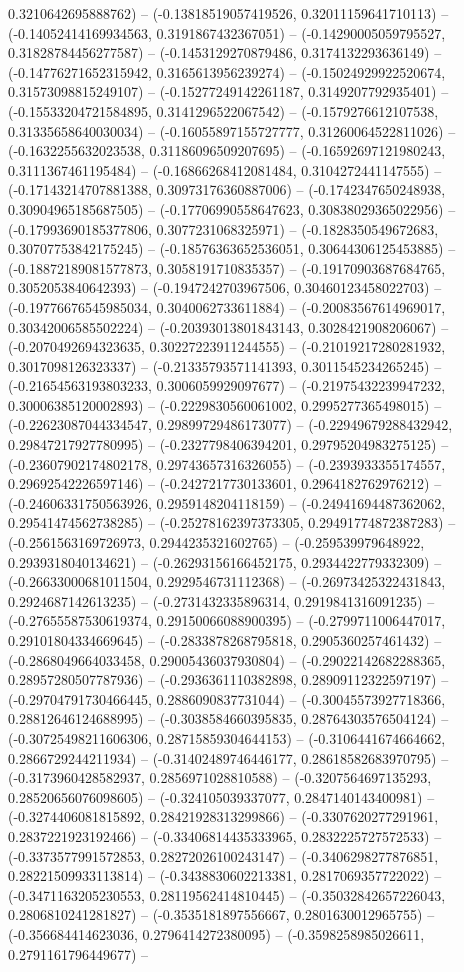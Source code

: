0.3210642695888762) -- (-0.13818519057419526, 0.32011159641710113) -- (-0.14052414169934563, 0.3191867432367051) -- (-0.14290005059795527, 0.31828784456277587) -- (-0.1453129270879486, 0.3174132293636149) -- (-0.14776271652315942, 0.3165613956239274) -- (-0.15024929922520674, 0.31573098815249107) -- (-0.15277249142261187, 0.3149207792935401) -- (-0.15533204721584895, 0.3141296522067542) -- (-0.1579276612107538, 0.31335658640030034) -- (-0.16055897155727777, 0.31260064522811026) -- (-0.1632255632023538, 0.31186096509207695) -- (-0.16592697121980243, 0.3111367461195484) -- (-0.16866268412081484, 0.3104272441147555) -- (-0.17143214707881388, 0.30973176360887006) -- (-0.1742347650248938, 0.30904965185687505) -- (-0.17706990558647623, 0.30838029365022956) -- (-0.17993690185377806, 0.3077231068325971) -- (-0.1828350549672683, 0.30707753842175245) -- (-0.18576363652536051, 0.30644306125453885) -- (-0.18872189081577873, 0.3058191710835357) -- (-0.19170903687684765, 0.3052053840642393) -- (-0.1947242703967506, 0.30460123458022703) -- (-0.19776676545985034, 0.3040062733611884) -- (-0.20083567614969017, 0.30342006585502224) -- (-0.20393013801843143, 0.3028421908206067) -- (-0.2070492694323635, 0.30227223911244555) -- (-0.21019217280281932, 0.3017098126323337) -- (-0.21335793571141393, 0.3011545234265245) -- (-0.21654563193803233, 0.3006059929097677) -- (-0.21975432239947232, 0.30006385120002893) -- (-0.2229830560061002, 0.2995277365498015) -- (-0.22623087044334547, 0.29899729486173077) -- (-0.22949679288432942, 0.29847217927780995) -- (-0.2327798406394201, 0.29795204983275125) -- (-0.23607902174802178, 0.29743657316326055) -- (-0.2393933355174557, 0.29692542226597146) -- (-0.2427217730133601, 0.2964182762976212) -- (-0.24606331750563926, 0.2959148204118159) -- (-0.24941694487362062, 0.29541474562738285) -- (-0.25278162397373305, 0.29491774872387283) -- (-0.2561563169726973, 0.2944235321602765) -- (-0.259539979648922, 0.2939318040134621) -- (-0.26293156166452175, 0.2934422779332309) -- (-0.26633000681011504, 0.2929546731112368) -- (-0.26973425322431843, 0.2924687142613235) -- (-0.2731432335896314, 0.2919841316091235) -- (-0.27655587530619374, 0.29150066088900395) -- (-0.2799711006447017, 0.29101804334669645) -- (-0.2833878268795818, 0.2905360257461432) -- (-0.2868049664033458, 0.29005436037930804) -- (-0.29022142682288365, 0.28957280507787936) -- (-0.2936361110382898, 0.28909112322597197) -- (-0.29704791730466445, 0.2886090837731044) -- (-0.30045573927718366, 0.28812646124688995) -- (-0.3038584660395835, 0.28764303576504124) -- (-0.30725498211606306, 0.28715859304644153) -- (-0.3106441674664662, 0.2866729244211934) -- (-0.31402489746446177, 0.28618582683970795) -- (-0.3173960428582937, 0.2856971028810588) -- (-0.3207564697135293, 0.28520656076098605) -- (-0.324105039337077, 0.2847140143400981) -- (-0.3274406081815892, 0.28421928313299866) -- (-0.3307620277291961, 0.2837221923192466) -- (-0.33406814435333965, 0.2832225727572533) -- (-0.3373577991572853, 0.28272026100243147) -- (-0.3406298277876851, 0.28221509933113814) -- (-0.3438830602213381, 0.2817069357722022) -- (-0.3471163205230553, 0.28119562414810445) -- (-0.35032842657226043, 0.2806810241281827) -- (-0.3535181897556667, 0.2801630012965755) -- (-0.356684414623036, 0.2796414272380095) -- (-0.3598258985026611, 0.2791161796449677) -- 
